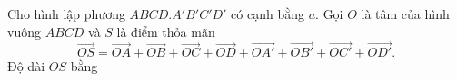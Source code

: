 \begin{ex}
Cho hình lập phương $ABCD.A'B'C'D'$ có cạnh bằng $a$. Gọi $O$ là tâm của hình vuông $ABCD$ và $S$ là điểm thỏa mãn
\[\overrightarrow{OS}=\overrightarrow{OA}+\overrightarrow{OB}+\overrightarrow{OC}+\overrightarrow{OD}+\overrightarrow{OA'}+\overrightarrow{OB'}+\overrightarrow{OC'}+\overrightarrow{OD'}.\]
Độ dài $OS$ bằng
\end{ex}
